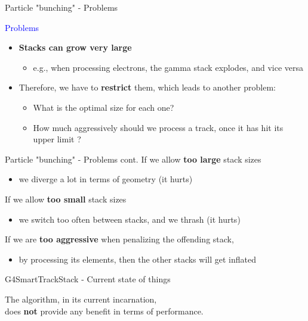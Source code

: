 \documentclass{beamer}
\begin{document}
\begin{frame}{Particle "bunching" - Problems}

\textcolor{blue}{Problems}
\begin{itemize}
\item {\bf Stacks can grow very large}
\begin{itemize}
\item e.g., when processing electrons, the gamma stack explodes, and vice versa
\end{itemize}
\item Therefore, we have to {\bf restrict} them, which leads to another problem:
\begin{itemize}
\item What is the optimal size for each one?
\item How much aggressively should we process a track, once it has hit its upper limit ?
\end{itemize}
\end{itemize}
\end{frame}

\begin{frame}{Particle "bunching" - Problems cont.}
If we allow {\bf too large} stack sizes
\begin{itemize}
\item we diverge a lot in terms of geometry (it hurts)
\end{itemize}
If we allow {\bf too small} stack sizes
\begin{itemize}
\item we switch too often between stacks, and we thrash (it hurts)
\end{itemize}
\vspace{5mm}
If we are {\bf too aggressive} when penalizing the offending stack,
\begin{itemize}
\item by processing its elements, then the other stacks will get inflated
\end{itemize}

\begin{center}
\end{center}

\end{frame}

\begin{frame}{G4SmartTrackStack - Current state of things}

\begin{center}
The algorithm, in its current incarnation,\\
does {\bf not} provide any benefit in terms of performance.
\end{center}
\end{frame}
\end{document}
